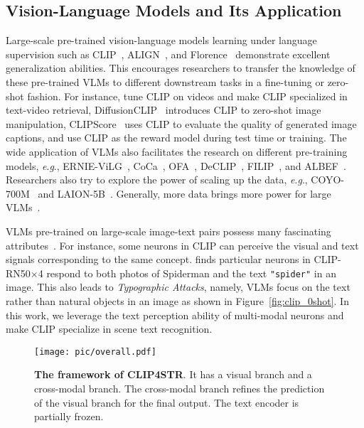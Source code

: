 \documentclass[lettersize,journal]{IEEEtran}
\newcommand{\eg}{\textit{e}.\textit{g}.}
\begin{document}
\subsection{Vision-Language Models and Its Application}
Large-scale pre-trained vision-language models learning under
language supervision such as CLIP~\cite{2021-clip}, ALIGN~\cite{2021-align}, and Florence~\cite{2021_florence} demonstrate excellent generalization abilities.
This encourages researchers to transfer the knowledge of these pre-trained VLMs to different downstream tasks in a fine-tuning or zero-shot fashion.
For instance, \cite{2022_clip4clip,2022_centerclip,wang2022align} tune CLIP on videos and make CLIP specialized in text-video retrieval,
DiffusionCLIP~\cite{2022_DiffusionCLIP} introduces CLIP to zero-shot image manipulation,
CLIPScore~\cite{2021_CLIPScore} uses CLIP to evaluate the quality of generated image captions,
and \cite{zhao2023rlcf,Cho2022CLIPReward} use CLIP as the reward model during test time or training.
The wide application of VLMs also facilitates the research on different pre-training models, \eg,
ERNIE-ViLG~\cite{2021_ERNIE-ViLG}, CoCa~\cite{2022_coca}, OFA~\cite{2022_ofa},
DeCLIP~\cite{li2021supervision}, FILIP~\cite{2022_filip}, and ALBEF~\cite{2021_li_albef}.
Researchers also try to explore the power of scaling up the data, \eg, COYO-700M~\cite{kakaobrain2022coyo-700m} and LAION-5B~\cite{2022_laion5b}.
Generally, more data brings more power for large VLMs~\cite{ilharco_gabriel_2021_5143773}.

VLMs pre-trained on large-scale image-text pairs possess many fascinating attributes~\cite{2021-clip,goh2021multimodal,2022_shen_how}.
For instance, some neurons in CLIP can perceive the visual and text signals corresponding to the same concept.
\cite{goh2021multimodal} finds particular neurons in CLIP-RN50$\times$4 respond to both photos of Spiderman and the text \texttt{"spider"} in an image.
This also leads to \textit{Typographic Attacks}, namely, VLMs focus on the text rather than natural objects in an image as shown in Figure~\ref{fig:clip_0shot}.
In this work, we leverage the text perception ability of multi-modal neurons and make CLIP specialize in scene text recognition.



\begin{figure*}[!t]
	\centering
	\texttt{[image: pic/overall.pdf]}
	\caption{\textbf{The framework of CLIP4STR}. It has a visual branch and a cross-modal branch.
 The cross-modal branch refines the prediction of the visual branch for the final output.
 The text encoder is partially frozen.}
	\label{fig:overall}
\end{figure*}
\end{document}
